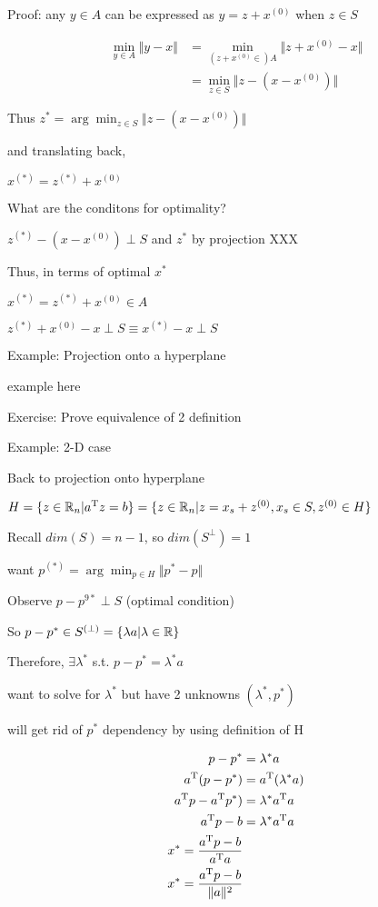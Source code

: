 Proof: any $y\in A$ can be expressed as $y=z+x^{(0)}$ when $z\in S$

\begin{align*}
\min_{y\in A} \Vert y-x\Vert&=\min_{(z+x^{(0)}\in) A} \Vert z+x^{(0)}-x\Vert\\
&=\min_{z\in S} \Vert z-(x-x^{(0)})\Vert
\end{align*}

Thus $z^{*}=\arg\min_{z\in S} \Vert z-(x-x^{(0)})\Vert$

and translating back,

$x^{(*)}=z^{(*)}+x^{(0)}$


What are the conditons for optimality?

$z^{(*)}-(x-x^{(0)})\perp S$ and $z^{*}$ by projection XXX

Thus, in terms of optimal $x^{*}$

$x^{(*)}=z^{(*)}+x^{(0)} \in A$

$z^{(*)}+x^{(0)}-x \perp S \equiv x^{(*)}-x\perp S$



Example: Projection onto a hyperplane

example here 

Exercise: Prove equivalence of 2 definition

Example: 2-D case




Back to projection onto hyperplane

$H=\{z\in\mathbb{R}_{n}|a^{{\rm T}} z=b\}=\{z\in\mathbb{R}_{n}|z=x_{s}+z^{(0)},x_{s}\in S, z^{(0)}\in H\}$

Recall $dim(S)=n-1$, so $dim(S^{\perp})=1$

\begin{marginfigure}
	\centering
	\resizebox{7.5cm}{3cm}{}
	\caption{}
	\label{}
\end{marginfigure}

want $p^{(*)}=\arg \min_{p\in H} \Vert p^{*}-p\Vert$

Observe $p-p^{9*} \perp S$ (optimal condition)

So $p-p^{*} \in S^{(\perp)}=\{\lambda a|\lambda \in \mathbb{R} \}$

Therefore, $\exists \lambda^{*}$ s.t.  $p-p^{*}=\lambda^{*}a$

want to solve for $\lambda^{*}$ but have 2 unknowns $(\lambda^{*},p^{*})$

will get rid of $p^{*}$ dependency by using definition of H

\begin{align*}
p-p^{*}&=\lambda^{*}a\\
a^{{\rm T}} (p-p^{*})&=a^{{\rm T}} (\lambda^{*}a)\\
a^{{\rm T}} p-a^{{\rm T}} p^{*})&=\lambda^{*}a^{{\rm T}} a\\
a^{{\rm T}} p-b&=\lambda^{*}a^{{\rm T}} a\\
x^{*}=\frac{a^{{\rm T}} p-b}{a^{{\rm T}} a}\\
x^{*}=\frac{a^{{\rm T}} p-b}{\Vert a\Vert^{2}}\\
\end{align*}

